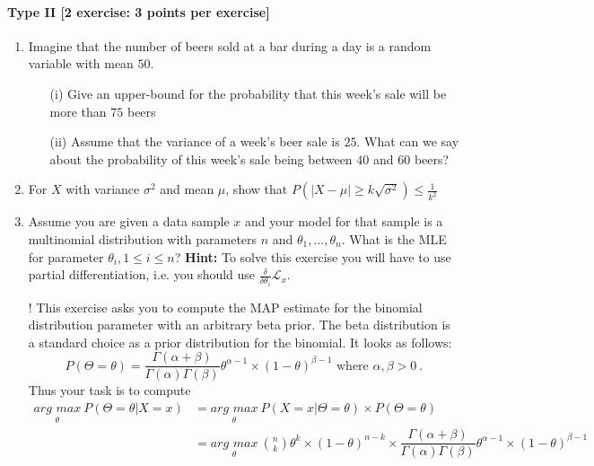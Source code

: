 \documentclass{article}
\begin{document}
\paragraph{Type II [2 exercise: 3 points per exercise]}
\begin{enumerate}
	\item Imagine that the number of beers sold at a bar during a day is a random variable with mean $50$.
		\begin{itemize}
			\item[(i)] Give an upper-bound for the probability that this week's sale will be more than $75$ beers
			\item[(ii)] Assume that the variance of a week's beer sale is $25$. What can we say about the probability of this week's sale being between $40$ and $60$ beers?
		\end{itemize}
	
	\item For $X$ with variance $\sigma^2$ and mean $\mu$, show that $P(|X-\mu| \geq k\sqrt{\sigma^2}) \leq \frac{1}{k^2}$
	
	\item Assume you are given a data sample $ x $ and your model for that sample is a multinomial distribution with parameters $ n $ and 
	$ \theta_{1}, \ldots, \theta_{n} $. What is the MLE for parameter $ \theta_{i}, 1 \leq i \leq n $? \textbf{Hint:} To solve this exercise you will
	have to use partial differentiation, i.e. you should use $ \frac{\delta}{\delta\theta_{i}}\mathcal{L}_{x} $.
	\item[\arabic{enumi}!] This exercise asks you to compute the MAP estimate for the binomial distribution parameter with an arbitrary beta prior. The beta distribution
	is a standard choice as a prior distribution for the binomial. It looks as follows:
	\begin{equation*}
	P(\Theta=\theta) = \dfrac{\Gamma(\alpha + \beta)}{\Gamma(\alpha)\Gamma(\beta)}\theta^{\alpha-1} \times (1-\theta)^{\beta-1} \mbox{ where } \alpha, \beta > 0 \ .
	\end{equation*}
	Thus your task is to compute
	\begin{align*}
	\underset{\theta}{arg\, \, max}~P(\Theta=\theta|X=x) &= \underset{\theta}{arg\, \, max}~P(X =x |\Theta = \theta) \times P(\Theta = \theta) \\
	&= \underset{\theta}{arg\, \, max}~\binom{n}{k}\theta^{k}\times (1-\theta)^{n-k} \times \dfrac{\Gamma(\alpha + \beta)}{\Gamma(\alpha)\Gamma(\beta)}\theta^{\alpha-1} \times (1-\theta)^{\beta-1}
	\end{align*}
\end{enumerate}
\end{document}
